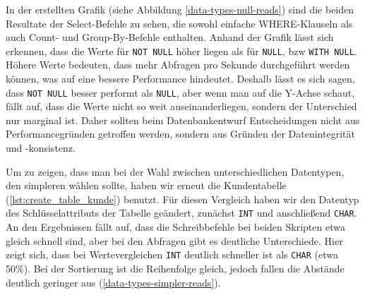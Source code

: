 In der erstellten Grafik (siehe Abbildung \ref{data-types-null-reads}) sind die beiden Resultate der Select-Befehle zu sehen, die sowohl einfache WHERE-Klauseln als auch Count- und Group-By-Befehle enthalten.
Anhand der Grafik lässt sich erkennen, dass die Werte für \texttt{NOT NULL} höher liegen als für \texttt{NULL}, bzw \texttt{WITH NULL}.
Höhere Werte bedeuten, dass mehr Abfragen pro Sekunde durchgeführt werden können, was auf eine bessere Performance hindeutet.
Deshalb lässt es sich sagen, dass \texttt{NOT NULL} besser performt als \texttt{NULL}, aber wenn man auf die Y-Achse schaut, fällt auf, dass die Werte nicht so weit auseinanderliegen, sondern der Unterschied nur marginal ist.
Daher sollten beim Datenbankentwurf Entscheidungen nicht aus Performancegründen getroffen werden, sondern aus Gründen der Datenintegrität und -konsistenz.

Um zu zeigen, dass man bei der Wahl zwischen unterschiedlichen Datentypen, den simpleren wählen sollte, haben wir erneut die Kundentabelle (\ref{lst:create_table_kunde}) benutzt.
Für diesen Vergleich haben wir den Datentyp des Schlüsselattributs der Tabelle geändert, zunächst \texttt{INT} und anschließend \texttt{CHAR}.
An den Ergebnissen fällt auf, dass die Schreibbefehle bei beiden Skripten etwa gleich schnell sind, aber bei den Abfragen gibt es deutliche Unterschiede.
Hier zeigt sich, dass bei Wertevergleichen \texttt{INT} deutlich schneller ist als \texttt{CHAR} (etwa 50\%).
Bei der Sortierung ist die Reihenfolge gleich, jedoch fallen die Abstände deutlich geringer aus (\ref{data-types-simpler-reads}).

